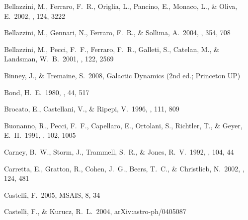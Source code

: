 \documentclass{emulateapj}
\begin{document}
\begin{thebibliography}{}
 Bellazzini, M., Ferraro,
  F.~R., Origlia, L., Pancino, E., Monaco, L., \& Oliva, E.\ 2002,
  \aj, 124, 3222

 Bellazzini, M., Gennari, N.,
  Ferraro, F.~R., \& Sollima, A.\ 2004, \mnras, 354, 708

 Bellazzini, M., Pecci, F.~F.,
  Ferraro, F.~R., Galleti, S., Catelan, M., \& Landsman, W.~B.\ 2001,
  \aj, 122, 2569


 Binney, J., \& Tremaine,
  S.\ 2008, Galactic Dynamics (2nd ed.; Princeton UP)

 Bond, H.~E.\ 1980, \apjs, 44, 517


 Brocato, E., Castellani, V., \&
  Ripepi, V.\ 1996, \aj, 111, 809


 Buonanno, R., Pecci, F.~F.,
  Capellaro, E., Ortolani, S., Richtler, T., \& Geyer, E.~H.\ 1991,
  \aj, 102, 1005

 Carney, B.~W., Storm, J.,
  Trammell, S.~R., \& Jones, R.~V.\ 1992, \pasp, 104, 44

 Carretta, E., Gratton, R.,
  Cohen, J.~G., Beers, T.~C., \& Christlieb, N.\ 2002, \aj, 124, 481


 Castelli, F.\ 2005, MSAIS, 8, 34


 Castelli, F., \& Kurucz,
  R.~L.\ 2004, arXiv:astro-ph/0405087



\end{thebibliography}
\end{document}
